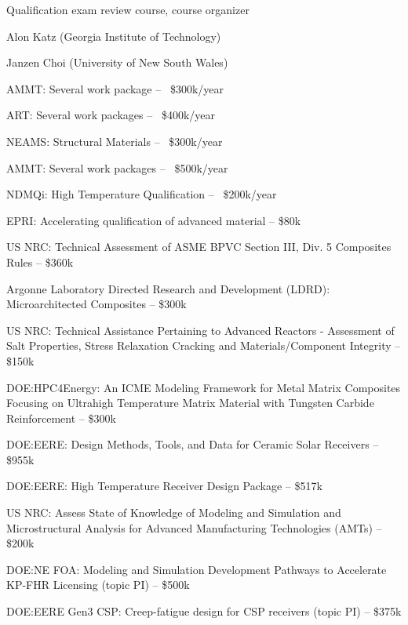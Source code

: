 Qualification exam review course, course organizer 


Alon Katz (Georgia Institute of Technology)  

Janzen Choi (University of New South Wales) 


AMMT: Several work package -- ~\$300k/year 

ART: Several work packages -- ~\$400k/year 

NEAMS: Structural Materials -- ~\$300k/year 

AMMT: Several work packages -- ~\$500k/year 

NDMQi: High Temperature Qualification -- ~\$200k/year 


EPRI: Accelerating qualification of advanced material -- \$80k 

US NRC: Technical Assessment of ASME BPVC Section III, Div. 5 Composites Rules -- \$360k 

Argonne Laboratory Directed Research and Development (LDRD): Microarchitected Composites -- \$300k 

US NRC: Technical Assistance Pertaining to Advanced Reactors - Assessment of Salt Properties, Stress Relaxation Cracking and Materials/Component Integrity -- \$150k 

DOE:HPC4Energy: An ICME Modeling Framework for Metal Matrix Composites Focusing on Ultrahigh Temperature Matrix Material with Tungsten Carbide Reinforcement -- \$300k 

DOE:EERE: Design Methods, Tools, and Data for Ceramic Solar Receivers -- \$955k 

DOE:EERE: High Temperature Receiver Design Package -- \$517k 

US NRC: Assess State of Knowledge of Modeling and Simulation and Microstructural Analysis for Advanced Manufacturing Technologies (AMTs) -- \$200k 

DOE:NE FOA: Modeling and Simulation Development Pathways to Accelerate KP-FHR Licensing (topic PI) -- \$500k 

DOE:EERE Gen3 CSP: Creep-fatigue design for CSP receivers (topic PI) -- \$375k 

